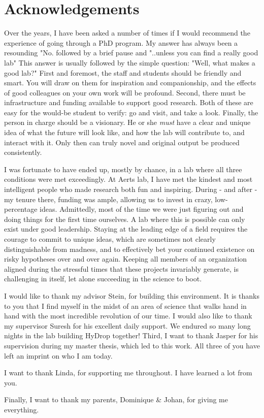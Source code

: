 \chapter*{Acknowledgements}

Over the years, I have been asked a number of times if I would recommend the experience of going through a PhD program. My answer has always been a resounding "No. followed by a brief pause and "..unless you can find a really good lab" This answer is usually followed by the simple question: "Well, what makes a good lab?" First and foremost, the staff and students should be friendly and smart. You will draw on them for inspiration and companionship, and the effects of good colleagues on your own work will be profound. Second, there must be infrastructure and funding available to support good research. Both of these are easy for the would-be student to verify: go and visit, and take a look. Finally, the person in charge should be a visionary. He or she \textit{must} have a clear and unique idea of what the future will look like, and how the lab will contribute to, and interact with it. Only then can truly novel and original output be produced consistently.

I was fortunate to have ended up, mostly by chance, in a lab where all three conditions were met exceedingly. At Aerts lab, I have met the kindest and most intelligent people who made research both fun and inspiring. During - and after - my tenure there, funding was ample, allowing us to invest in crazy, low-percentage ideas. Admittedly, most of the time we were just figuring out and doing things for the first time ourselves. A lab where this is possible can only exist under good leadership. Staying at the leading edge of a field requires the courage to commit to unique ideas, which are sometimes not clearly distinguishable from madness, and to effectively bet your continued existence on risky hypotheses over and over again. Keeping all members of an organization aligned during the stressful times that these projects invariably generate, is challenging in itself, let alone succeeding in the science to boot.

I would like to thank my advisor Stein, for building this environment. It is thanks to you that I find myself in the midst of an area of science that walks hand in hand with the most incredible revolution of our time. I would also like to thank my supervisor Suresh for his excellent daily support. We endured so many long nights in the lab building HyDrop together! Third, I want to thank Jasper for his supervision during my master thesis, which led to this work. All three of you have left an imprint on who I am today.

I want to thank Linda, for supporting me throughout. I have learned a lot from you.

Finally, I want to thank my parents, Dominique \& Johan, for giving me everything.
